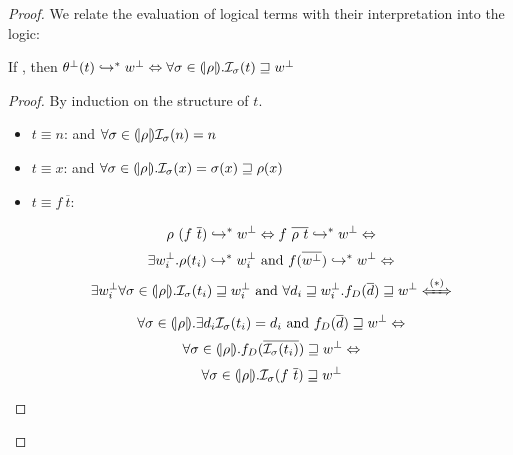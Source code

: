\begin{proof}
We relate the evaluation of logical terms with their interpretation
into the logic:
%
\begin{lemma}
If , then
$	\theta^\perp(t) \hookrightarrow_{}^{*} w^\perp 
	\Leftrightarrow 
	\forall\sigma\in (\!|\rho|\!).\mathcal{I}_{\sigma}(t) \sqsupseteq w^\perp$  
\end{lemma}
\begin{proof}
By induction on the structure of $t$.
\begin{itemize}
\item $t \equiv n$:  and 
	  $\forall\sigma \in (\!|\rho|\!)\mathcal{I}_{\sigma}(n) = n$
\item $t \equiv x$:
		 and 
		$\forall\sigma \in (\!|\rho|\!). 
		\mathcal{I}_{\sigma}(x) = \sigma(x) \sqsupseteq \rho(x)$
\item $t \equiv f\ \overline{t}$:

	$$
		\rho\ (f\ \overline{t}) \hookrightarrow_{}^{*} w^\perp \Leftrightarrow
		f\ \overline{\rho\ t} \hookrightarrow_{}^{*} w^\perp \Leftrightarrow	
	$$
	$$	
		\exists w^\perp_i. \rho(t_i) \hookrightarrow_{}^{*} w^\perp_i \text{ and } f ({\overline{w^\perp}}) \hookrightarrow_{}^{*} w^\perp \Leftrightarrow	
	$$
	$$	
		\exists\botv_i\forall\sigmamodel \in \instance{\rho}.\interpIGEq{\instance{\rho}}{t_i}{\botv_i} \text{ and } 		
		\forall d_i\sqsupseteq\botv_i. f_D(\overline{d}) \sqsupseteq \botv \xLeftrightarrow{(*)}	
	$$
	$$	
		\forall\sigma \in (\!|\rho|\!).\exists d_i\mathcal{I}_{\sigma}(t_i) = d_i \text{ and } 		
		f_D(\overline{d}) \sqsupseteq w^\perp \Leftrightarrow	
	$$
	$$	
		\forall\sigma \in (\!|\rho|\!).
		f_D(\overline{\mathcal{I}_{\sigma}(t_i)}) \sqsupseteq w^\perp \Leftrightarrow	
	$$
	$$	
		\forall\sigmamodel \in \instance{\rho}.\interpIGEq{\sigmamodel}{f\ \overline{t}}{\botv} 
	$$


\end{itemize}
\end{proof}
\end{proof}

